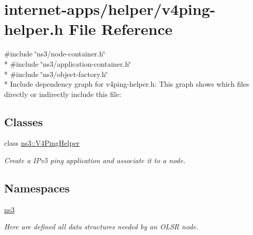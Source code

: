 \hypertarget{v4ping-helper_8h}{}\section{internet-\/apps/helper/v4ping-\/helper.h File Reference}
\label{v4ping-helper_8h}
{\ttfamily \#include \char`\"{}ns3/node-\/container.\+h\char`\"{}}\\*
{\ttfamily \#include \char`\"{}ns3/application-\/container.\+h\char`\"{}}\\*
{\ttfamily \#include \char`\"{}ns3/object-\/factory.\+h\char`\"{}}\\*
Include dependency graph for v4ping-\/helper.h\+:
This graph shows which files directly or indirectly include this file\+:
\subsection*{Classes}
\begin{DoxyCompactItemize}
\item 
class \hyperlink{classns3_1_1V4PingHelper}{ns3\+::\+V4\+Ping\+Helper}
\begin{DoxyCompactList}\small\item\em Create a I\+Pv5 ping application and associate it to a node. \end{DoxyCompactList}\end{DoxyCompactItemize}
\subsection*{Namespaces}
\begin{DoxyCompactItemize}
\item 
 \hyperlink{namespacens3}{ns3}
\begin{DoxyCompactList}\small\item\em Here are defined all data structures needed by an O\+L\+SR node. \end{DoxyCompactList}\end{DoxyCompactItemize}
